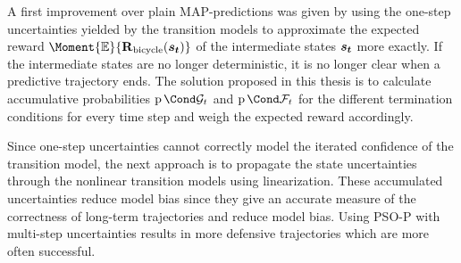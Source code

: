 A first improvement over plain MAP-predictions was given by using the one-step uncertainties yielded by the transition models to approximate the expected reward $\Moment{\E}{\RwdBicycle(\rv{s_t})}$ of the intermediate states $\bm{s_t}$ more exactly.
If the intermediate states are no longer deterministic, it is no longer clear when a predictive trajectory ends.
The solution proposed in this thesis is to calculate accumulative probabilities $\Prob{\PGoal_t}$ and $\Prob{\PFallen_t}$ for the different termination conditions for every time step and weigh the expected reward accordingly.

Since one-step uncertainties cannot correctly model the iterated confidence of the transition model, the next approach is to propagate the state uncertainties through the nonlinear transition models using linearization.
These accumulated uncertainties reduce model bias since they give an accurate measure of the correctness of long-term trajectories and reduce model bias.
Using PSO-P with multi-step uncertainties results in more defensive trajectories which are more often successful.

